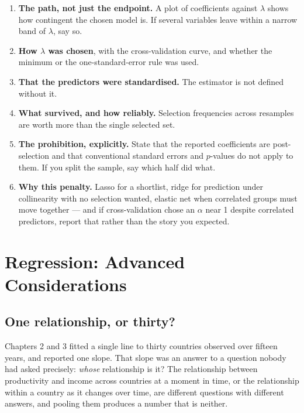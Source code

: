 \documentclass[
  letterpaper,
  10pt,
  twoside,
  openright,
  numbers=noenddot,
  chapterprefix=true]{scrbook}
\providecommand{\tightlist}{%
  \setlength{\itemsep}{0pt}\setlength{\parskip}{0pt}}
\begin{document}
\begin{enumerate}
\def\labelenumi{\arabic{enumi}.}
\tightlist
\item
  \textbf{The path, not just the endpoint.} A plot of coefficients
  against \(\lambda\) shows how contingent the chosen model is. If
  several variables leave within a narrow band of \(\lambda\), say so.
\item
  \textbf{How \(\lambda\) was chosen}, with the cross-validation curve,
  and whether the minimum or the one-standard-error rule was used.
\item
  \textbf{That the predictors were standardised.} The estimator is not
  defined without it.
\item
  \textbf{What survived, and how reliably.} Selection frequencies across
  resamples are worth more than the single selected set.
\item
  \textbf{The prohibition, explicitly.} State that the reported
  coefficients are post-selection and that conventional standard errors
  and \(p\)-values do not apply to them. If you split the sample, say
  which half did what.
\item
  \textbf{Why this penalty.} Lasso for a shortlist, ridge for prediction
  under collinearity with no selection wanted, elastic net when
  correlated groups must move together --- and if cross-validation chose
  an \(\alpha\) near 1 despite correlated predictors, report that rather
  than the story you expected.
\end{enumerate}


\chapter{Regression: Advanced
Considerations}\label{regression-advanced-considerations}

\section{One relationship, or thirty?}\label{one-relationship-or-thirty}

Chapters 2 and 3 fitted a single line to thirty countries observed over
fifteen years, and reported one slope. That slope was an answer to a
question nobody had asked precisely: \emph{whose} relationship is it?
The relationship between productivity and income across countries at a
moment in time, or the relationship within a country as it changes over
time, are different questions with different answers, and pooling them
produces a number that is neither.
\end{document}
